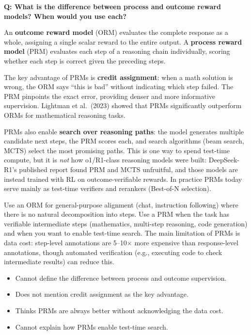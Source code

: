 \begin{interviewq}
\textbf{Q: What is the difference between process and outcome reward
models?  When would you use each?}

 \quad {} \quad
\badgefreq{\freqmed}

\stronganswer
An \textbf{outcome reward model} (ORM) evaluates the complete response as a
whole, assigning a single scalar reward to the entire output.  A
\textbf{process reward model} (PRM) evaluates each step of a reasoning
chain individually, scoring whether each step is correct given the
preceding steps.

The key advantage of PRMs is \textbf{credit assignment}: when a math
solution is wrong, the ORM says ``this is bad'' without indicating which
step failed.  The PRM pinpoints the exact error, providing denser and more
informative supervision.  Lightman et al.\ (2023) showed that PRMs
significantly outperform ORMs for mathematical reasoning tasks.

PRMs also enable \textbf{search over reasoning paths}: the model generates
multiple candidate next steps, the PRM scores each, and search algorithms
(beam search, MCTS) select the most promising paths.  This is one way to
spend test-time compute, but it is \emph{not} how o1/R1-class reasoning
models were built: DeepSeek-R1's published report found PRM and MCTS
unfruitful, and those models are instead trained with RL on
outcome-verifiable rewards.  In practice PRMs today serve mainly as
test-time verifiers and rerankers (Best-of-N selection).

Use an ORM for general-purpose alignment (chat, instruction following)
where there is no natural decomposition into steps.  Use a PRM when the
task has verifiable intermediate steps (mathematics, multi-step
reasoning, code generation) and when you want to enable test-time search.
The main limitation of PRMs is data cost: step-level annotations are
5--10$\times$ more expensive than response-level annotations, though
automated verification (e.g., executing code to check intermediate results)
can reduce this.

\redflags
\begin{itemize}
\item Cannot define the difference between process and outcome supervision.
\item Does not mention credit assignment as the key advantage.
\item Thinks PRMs are always better without acknowledging the data cost.
\item Cannot explain how PRMs enable test-time search.
\end{itemize}


\end{interviewq}
